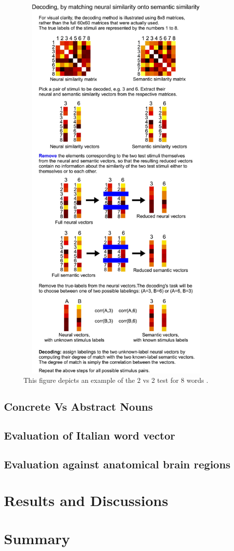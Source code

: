 \begin{figure}[h]
\centering
\includegraphics[width=10cm, height=20cm]{Figures/2vs2_anderson}
\caption{ This figure depicts an example of the 2 vs 2 test for 8 words \cite{Anderson2015}.}
\label{2 vs 2}
\end{figure}



\subsection{Concrete Vs Abstract Nouns}

\subsection{Evaluation of Italian word vector}

\subsection{Evaluation against anatomical brain regions}

\section{Results and Discussions}

\section{Summary}



